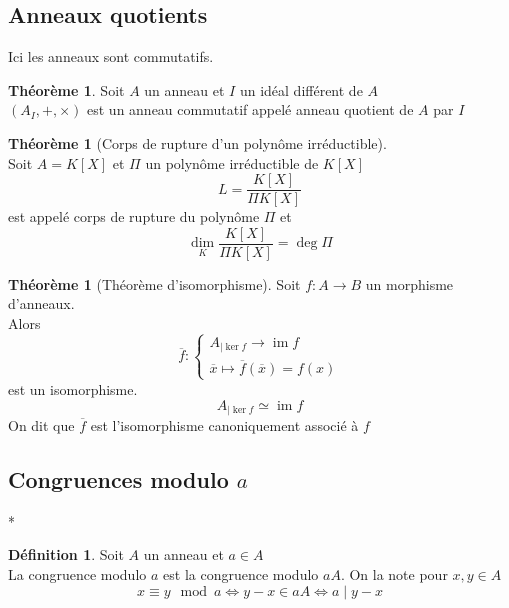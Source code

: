 \documentclass[10pt,a4paper]{article}
\theoremstyle{definition}
\newtheorem{theorem}[proposition]{Théorème}
\newtheorem{definition}[proposition]{Définition}
\DeclareMathOperator{\im}{im}
\begin{document}
\subsection{Anneaux quotients}
Ici les anneaux sont commutatifs.
\begin{theorem}
Soit $A$ un anneau et $I$ un idéal différent de $A$ \\
$(A_I, +, \times)$ est un anneau commutatif appelé anneau quotient de $A$ par $I$
\end{theorem}
\begin{theorem}[Corps de rupture d'un polynôme irréductible]
\hfill \\
Soit $A = K[X]$ et $\Pi$ un polynôme irréductible de $K[X]$
\[ L = \frac{K[X]}{\Pi K[X]} \]
est appelé corps de rupture du polynôme $\Pi$ et
\[ \underset{K}{\dim} \frac{K[X]}{\Pi K[X]} = \deg \Pi \]
\end{theorem}
\begin{theorem}[Théorème d'isomorphisme]
Soit $f : A \to B$ un morphisme d'anneaux. \\
Alors
\[ \overline{f}: \begin{cases}
A_{|\ker f} \to \im f \\
\overline{x} \mapsto \overline{f}(\overline{x}) = f(x)
\end{cases}\]
est un isomorphisme.
\[ A_{|\ker f} \simeq \im f \]
On dit que $\overline{f}$ est l'isomorphisme canoniquement associé à $f$
\end{theorem}

\subsection{Congruences modulo $a$}*
\begin{definition}
Soit $A$ un anneau et $a \in A$ \\
La congruence modulo $a$ est la congruence modulo $a A$. On la note pour $x, y \in A$
\[ x \equiv y \mod a \iff y - x \in a A \iff a \mid y - x \]
\end{definition}
\end{document}
